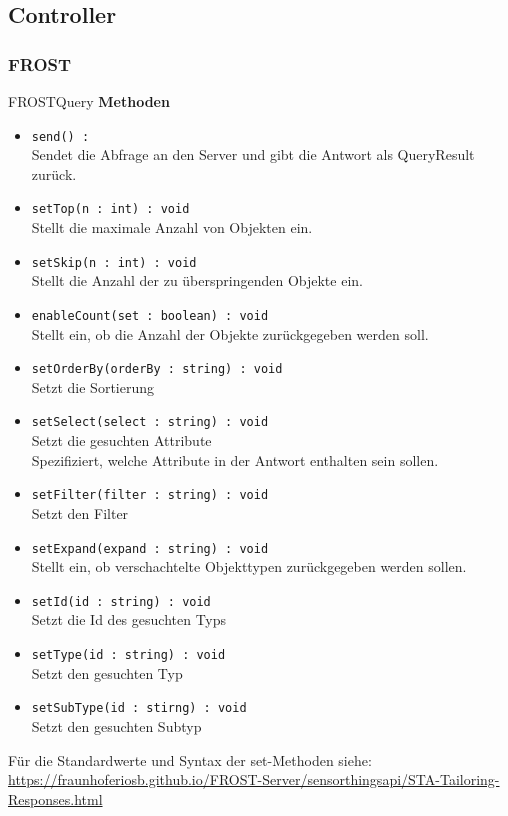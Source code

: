 \subsection{Controller}

\subsubsection{FROST}

\begin{Class}{FROSTQuery}
    \textbf{Methoden}
    \begin{itemize}
        \item \texttt{send() : }
        \\Sendet die Abfrage an den Server und gibt die Antwort als QueryResult zurück.
        \item \texttt{setTop(n : int) : void}
        \\Stellt die maximale Anzahl von Objekten ein.
        \item \texttt{setSkip(n : int) : void}
        \\Stellt die Anzahl der zu überspringenden Objekte ein.
        \item \texttt{enableCount(set : boolean) : void}
        \\Stellt ein, ob die Anzahl der Objekte zurückgegeben werden soll.
        \item \texttt{setOrderBy(orderBy : string) : void}
        \\Setzt die Sortierung
        \item \texttt{setSelect(select : string) : void}
        \\Setzt die gesuchten Attribute
        \\Spezifiziert, welche Attribute in der Antwort enthalten sein sollen.
        \item \texttt{setFilter(filter : string) : void}
        \\Setzt den Filter
        \item \texttt{setExpand(expand : string) : void}
        \\Stellt ein, ob verschachtelte Objekttypen zurückgegeben werden sollen.
        \item \texttt{setId(id : string) : void}
        \\Setzt die Id des gesuchten Typs
        \item \texttt{setType(id : string) : void}
        \\Setzt den gesuchten Typ
        \item \texttt{setSubType(id : stirng) : void}
        \\Setzt den gesuchten Subtyp
    \end{itemize}
    Für die Standardwerte und Syntax der set-Methoden siehe: \url{https://fraunhoferiosb.github.io/FROST-Server/sensorthingsapi/STA-Tailoring-Responses.html}
\end{Class}

